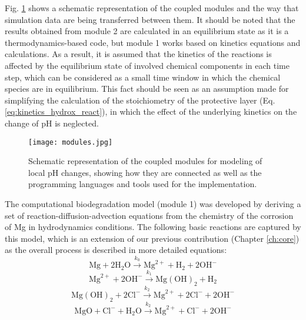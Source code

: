 Fig. \ref{fig:kinetics_modules} shows a schematic representation of the coupled modules and the way that simulation data are being transferred between them. It should be noted that the results obtained from module 2 are calculated in an equilibrium state as it is a thermodynamics-based code, but module 1 works based on kinetics equations and calculations. As a result, it is assumed that the kinetics of the reactions is affected by the equilibrium state of involved chemical components in each time step, which can be considered as a small time window in which the chemical species are in equilibrium. This fact should be seen as an assumption made for simplifying the calculation of the stoichiometry of the protective layer (Eq. \ref{eq:kinetics_hydrox_react}), in which the effect of the underlying kinetics on the change of pH is neglected.

\begin{figure}[h]
\centering
\medskip
\texttt{[image: modules.jpg]}
\caption[Schematic representation of the coupled modules for modeling of local pH changes]{Schematic representation of the coupled modules for modeling of local pH changes, showing how they are connected as well as the programming languages and tools used for the implementation.} \label{fig:kinetics_modules}
\end{figure}

The computational biodegradation model (module 1) was developed by deriving a set of reaction-diffusion-advection equations from the chemistry of the corrosion of Mg in hydrodynamics conditions. The following basic reactions are captured by this model, which is an extension of our previous contribution \cite{Barzegari2021} (Chapter \ref{ch:core}) as the overall process is described in more detailed equations:
\begin{equation} \label{eq:kinetics_oxidation_react1}
\mathrm{Mg}+2 \mathrm{H}_{2} \mathrm{O} \stackrel{k_{0}}{\rightarrow} \mathrm{Mg}^{2+}+\mathrm{H}_{2}+2 \mathrm{OH}^{-}
\end{equation}
\begin{equation} \label{eq:kinetics_oxidation_react2}
\mathrm{Mg}^{2+}+2 \mathrm{OH}^{-} \stackrel{k_{1}}{\rightarrow} \mathrm{Mg}(\mathrm{OH})_{2}+\mathrm{H}_{2}
\end{equation}
\begin{equation} \label{eq:kinetics_break_react}
\mathrm{Mg}(\mathrm{OH})_{2}+2 \mathrm{Cl}^{-} \stackrel{k_{2}}{\rightarrow} \mathrm{Mg}^{2+}+2 \mathrm{Cl}^{-}+2 \mathrm{OH}^{-}
\end{equation}
\begin{equation} \label{eq:kinetics_break_react_mgo}
\mathrm{MgO}+ \mathrm{Cl}^{-} + \mathrm{H}_{2} \mathrm{O} \stackrel{k_{2}}{\rightarrow} \mathrm{Mg}^{2+}+ \mathrm{Cl}^{-}+ 2\mathrm{OH}^{-}
\end{equation}

